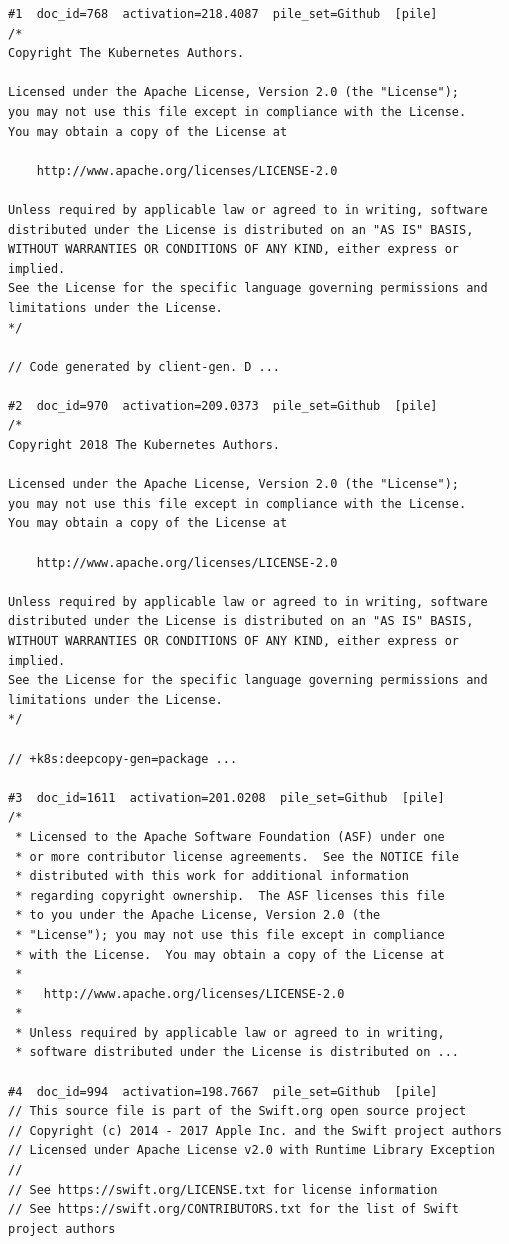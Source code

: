 \begin{verbatim}
#1  doc_id=768  activation=218.4087  pile_set=Github  [pile]
/*
Copyright The Kubernetes Authors.

Licensed under the Apache License, Version 2.0 (the "License");
you may not use this file except in compliance with the License.
You may obtain a copy of the License at

    http://www.apache.org/licenses/LICENSE-2.0

Unless required by applicable law or agreed to in writing, software
distributed under the License is distributed on an "AS IS" BASIS,
WITHOUT WARRANTIES OR CONDITIONS OF ANY KIND, either express or implied.
See the License for the specific language governing permissions and
limitations under the License.
*/

// Code generated by client-gen. D ...

#2  doc_id=970  activation=209.0373  pile_set=Github  [pile]
/*
Copyright 2018 The Kubernetes Authors.

Licensed under the Apache License, Version 2.0 (the "License");
you may not use this file except in compliance with the License.
You may obtain a copy of the License at

    http://www.apache.org/licenses/LICENSE-2.0

Unless required by applicable law or agreed to in writing, software
distributed under the License is distributed on an "AS IS" BASIS,
WITHOUT WARRANTIES OR CONDITIONS OF ANY KIND, either express or implied.
See the License for the specific language governing permissions and
limitations under the License.
*/

// +k8s:deepcopy-gen=package ...

#3  doc_id=1611  activation=201.0208  pile_set=Github  [pile]
/*
 * Licensed to the Apache Software Foundation (ASF) under one
 * or more contributor license agreements.  See the NOTICE file
 * distributed with this work for additional information
 * regarding copyright ownership.  The ASF licenses this file
 * to you under the Apache License, Version 2.0 (the
 * "License"); you may not use this file except in compliance
 * with the License.  You may obtain a copy of the License at
 *
 *   http://www.apache.org/licenses/LICENSE-2.0
 *
 * Unless required by applicable law or agreed to in writing,
 * software distributed under the License is distributed on ...

#4  doc_id=994  activation=198.7667  pile_set=Github  [pile]
// This source file is part of the Swift.org open source project
// Copyright (c) 2014 - 2017 Apple Inc. and the Swift project authors
// Licensed under Apache License v2.0 with Runtime Library Exception
//
// See https://swift.org/LICENSE.txt for license information
// See https://swift.org/CONTRIBUTORS.txt for the list of Swift project authors



\end{verbatim}
